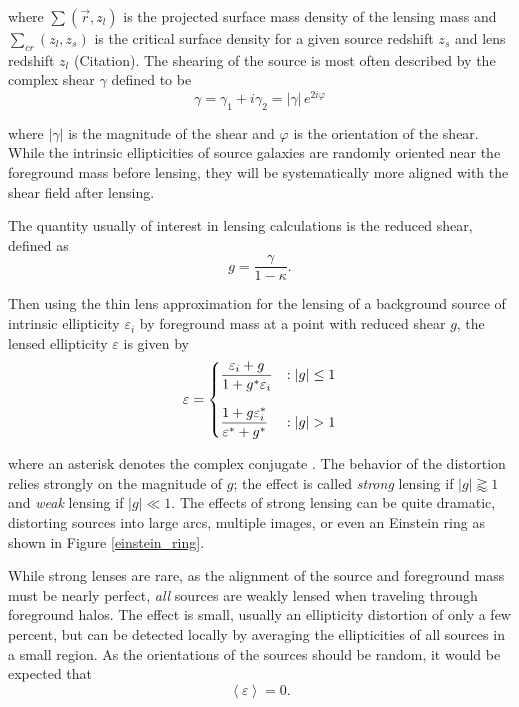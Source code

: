 \documentclass[%
 reprint,
 amsmath,amssymb,
 aps,nofootinbib
]{revtex4-1}
\begin{document}
\noindent where $\sum(\vec{r},z_l)$ is the projected surface mass density of the lensing mass and $\sum_{cr}(z_l,z_s)$ is the critical surface density for a given source redshift $z_s$ and lens redshift $z_l$ (Citation). The shearing of the source is most often described by the complex shear $\gamma$ defined to be
\begin{equation}\label{complex_shear}
\gamma=\gamma_1+i\gamma_2=|\gamma|\,e^{2i\varphi}
\end{equation}

\noindent where $|\gamma|$ is the magnitude of the shear and $\varphi$ is the orientation of the shear. While the intrinsic ellipticities of source galaxies are randomly oriented near the foreground mass before lensing, they will be systematically more aligned with the shear field after lensing.%

The quantity usually of interest in lensing calculations is the reduced shear, defined as
\begin{equation}\label{reduced_shear}
g=\frac{\gamma}{1-\kappa}.
\end{equation}

\noindent Then using the thin lens approximation for the lensing of a background source of intrinsic ellipticity $\varepsilon_i$ by foreground mass at a point with reduced shear $g$, the lensed ellipticity $\varepsilon$ is given by
\begin{equation}\label{lensing}
 \varepsilon = \begin{dcases}
      \frac{\varepsilon_i+g}{1+g^*\varepsilon_i} & : |g|\leq1 \\[0.75em]
       \frac{1+g\varepsilon_i^*}{\varepsilon^*+g^*} & : |g|>1
   \end{dcases}
\end{equation}

\noindent where an asterisk denotes the complex conjugate \cite{schneider}. The behavior of the distortion relies strongly on the magnitude of $g$; the
effect is called \textit{strong} lensing if $|g|\gtrapprox1$ and \textit{weak} lensing if $|g|\ll1$. The effects of strong lensing can be quite dramatic, distorting sources into large arcs, multiple images, or even an Einstein ring as shown in Figure \ref{einstein_ring}.

While strong lenses are rare, as the alignment of the source and foreground mass must be nearly perfect, \textit{all} sources are weakly lensed when traveling through foreground halos. The effect is small, usually an ellipticity distortion of only a few percent, but can be detected locally by averaging the ellipticities of all sources in a small region. As the orientations of the sources should be random, it would be expected that
$$\left<\varepsilon\right>=0.$$
\end{document}
